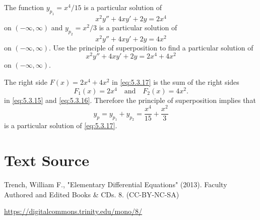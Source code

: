 \documentclass{ximera}
\begin{document}
\begin{example}\label{example:5.3.4} 
The function
 $y_{p_1}=x^4/15$ is a   particular solution of
\begin{equation} \label{eq:5.3.15}
x^2y''+4xy'+2y=2x^4
\end{equation}
on $(-\infty,\infty)$
and  $y_{p_2}=x^2/3$  is a particular solution of
\begin{equation} \label{eq:5.3.16}
x^2y''+4xy'+2y=4x^2
\end{equation}
on $(-\infty,\infty)$.
Use  the principle of superposition to
find a particular solution of
\begin{equation} \label{eq:5.3.17}
x^2y''+4xy'+2y=2x^4+4x^2
\end{equation}
on $(-\infty,\infty)$.


\begin{explanation}  The right side $F(x)=2x^4+4x^2$ in \eqref{eq:5.3.17}
is the sum of the right sides
$$
F_1(x)=2x^4\quad\mbox{and}\quad F_2(x)=4x^2.
$$
in  \eqref{eq:5.3.15}  and \eqref{eq:5.3.16}.
Therefore the principle of superposition implies that
$$
y_p=y_{p_1}+y_{p_2}=\frac{x^4}{15}+\frac{x^2}{3}
$$
is a particular solution of \eqref{eq:5.3.17}.
\end{explanation}
\end{example}

\section*{Text Source}
Trench, William F., "Elementary Differential Equations" (2013). Faculty Authored and Edited Books \& CDs. 8. (CC-BY-NC-SA)

\href{https://digitalcommons.trinity.edu/mono/8/}{https://digitalcommons.trinity.edu/mono/8/}
\end{document}
